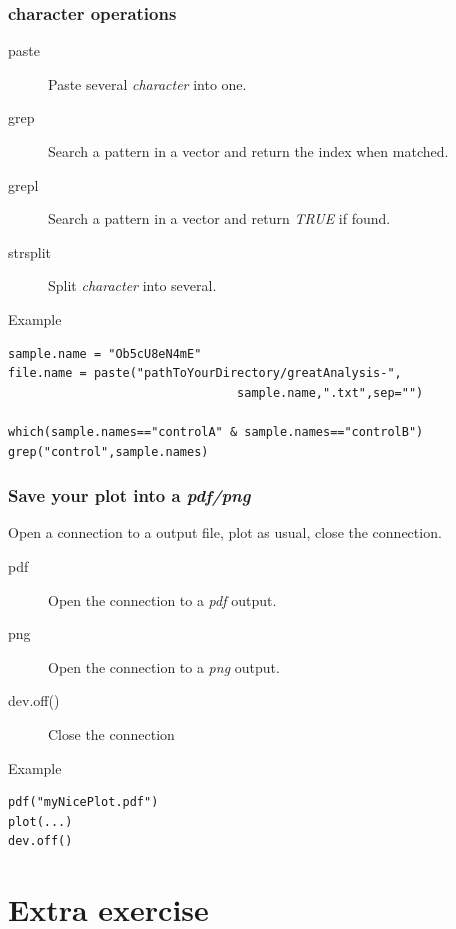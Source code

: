 \documentclass[10pt]{beamer}
\newenvironment{xframe}[2][]
  {\begin{frame}[fragile,environment=xframe,#1]
  \frametitle{#2}}
  {\end{frame}}
\begin{document}
\begin{xframe}{{\sf character} operations}
  \begin{block}{}
    \begin{description}
      \item[paste] Paste several {\it character} into one.
      \item[grep] Search a pattern in a {\sf vector} and return the index when matched.
      \item[grepl] Search a pattern in a {\sf vector} and return {\it TRUE} if found.
      \item[strsplit] Split {\it character} into several.
    \end{description}
  \end{block}
  \begin{exampleblock}{Example}
\begin{verbatim}
sample.name = "Ob5cU8eN4mE"
file.name = paste("pathToYourDirectory/greatAnalysis-",
                                sample.name,".txt",sep="")

which(sample.names=="controlA" & sample.names=="controlB")
grep("control",sample.names)
\end{verbatim}  
  \end{exampleblock}
\end{xframe}


\begin{xframe}{Save your plot into a {\it pdf/png}}
  \begin{block}{}
    Open a connection to a output file, plot as usual, close the connection.
    \begin{description}
    \item[pdf] Open the connection to a {\it pdf} output.
    \item[png] Open the connection to a {\it png} output.
    \item[dev.off()] Close the connection
    \end{description}
  \end{block}
  \begin{exampleblock}{Example}
\begin{verbatim}
pdf("myNicePlot.pdf")
plot(...)
dev.off()
\end{verbatim}  
  \end{exampleblock}
\end{xframe}

\section{Extra exercise}
\end{document}
